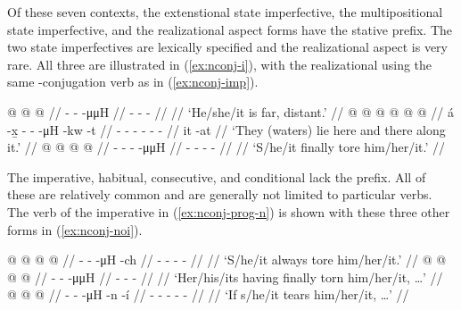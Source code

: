 \begin{multicols}{2}
Of these seven contexts, the extenstional state imperfective, the multipositional state imperfective, and the realizational aspect forms have the  stative prefix.
The two state imperfectives are lexically specified and the realizational aspect is very rare.
All three are illustrated in (\ref{ex:nconj-i}), with the realizational using the same -conjugation verb as in (\ref{ex:nconj-imp}).

\pex\label{ex:nconj-i}%
\a\label{ex:nconj-i-extstate}%
%
\begingl
	\gla	{} @ {} @ {} @ {} //
	\glb	{}- -  -μμH //
	\glc	{}- -  - //
	\gld	{} {} {} {} //
	\glft	‘He/she/it is far, distant.’
		//
\endgl
\a\label{ex:nconj-i-mposstate}%
%
\begingl
	\gla	{} @ {}  @ {} @ {} @ {} @ {} @ {} //
	\glb	á -x̱ - -  -μH -kw -t //
	\glc	{} - - -  - -\xx{rep} - //
	\gld	it -at  {} {} {} {} {} //
	\glft	‘They (waters) lie here and there along it.’
		//
\endgl
\a\label{ex:nconj-i-realizational}%
%
\begingl
	\gla	{} @ {} @ {} @ {} @ {} //
	\glb	{}- - -  -μμH //
	\glc	{}- - -  -\xx{var} //
	\gld	{} {} {} {} {} //
	\glft	‘S/he/it finally tore him/her/it.’
		//
\endgl
\xe

The imperative, habitual, consecutive, and conditional lack the  prefix.
All of these are relatively common and are generally not limited to particular verbs.
The verb of the imperative in (\ref{ex:nconj-prog-n}) is shown with these three other forms in (\ref{ex:nconj-noi}).

\pex\label{ex:nconj-noi}%
\a\label{ex:nconj-noi-habitual}%
%
\begingl
	\gla	{} @ {} @ {} @ {} @ {} //
	\glb	{}- -  -μH -ch //
	\glc	{}- -  - - //
	\gld	{} {} {} {} {} //
	\glft	‘S/he/it always tore him/her/it.’
		//
\endgl
\a\label{ex:nconj-noi-consecutive}%
%
\begingl
	\gla	{} @ {} @ {} @ {} @ {} //
	\glb	{}- -  -μμH {} //
	\glc	{}- -  -  //
	\gld	{} {} {} {} {} //
	\glft	‘Her/his/its having finally torn him/her/it, …’
		//
\endgl
\a\label{ex:nconj-noi-conditional}%
%
\begingl
	\gla	{} @ {} @ {} @ {} //
	\glb	{}- -  -μH -n -í //
	\glc	{}- -  - - - //
	\gld	{} {} {} {} //
	\glft	‘If s/he/it tears him/her/it, …’
		//
\endgl
\xe


\end{multicols}
